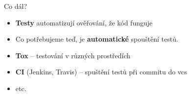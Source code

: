 \begin{frame}
\begin{center}
\huge{Co dál?}
\end{center}
\end{frame}

\begin{frame}
\begin{itemize}[<+->]
\item {\bf Testy} automatizují ověřování, že kód funguje
\item Co potřebujeme teď, je {\bf automatické} spouštění testů.
\item {\bf Tox} -- testování v různých prostředích
\item {\bf CI} (Jenkins, Travis) -- spuštění testů při commitu do vcs
\item etc.
\end{itemize}
\end{frame}